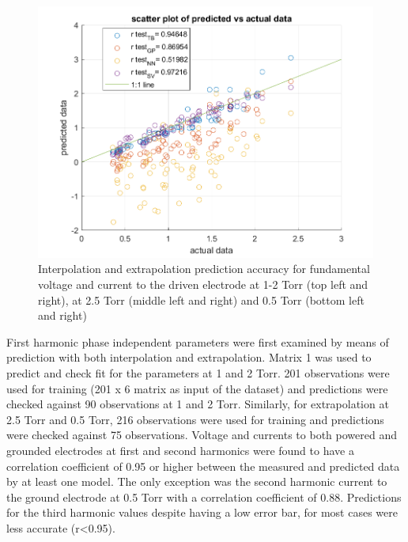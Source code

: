 \documentclass[12pt]{iopart}
\begin{document}
\begin{figure}[ht!]
\begin{center}
\begin{minipage}{0.495\textwidth}
\end{minipage}
\begin{minipage}{0.495\textwidth}
    \includegraphics[width=1\textwidth]{current1500mT.png}
\end{minipage}

\caption{Interpolation and extrapolation prediction accuracy for fundamental voltage and current to the driven electrode at 1-2 Torr (top left and right), at 2.5 Torr (middle left and right) and 0.5 Torr (bottom left and right) } 

\label{Fig:gap_SV,pressure_TB,species_TB}
\end{center}
\end{figure}

First harmonic phase independent parameters were first examined by means of prediction with both interpolation and extrapolation. Matrix 1 was used to predict and check fit for the parameters at 1 and 2 Torr. 201 observations were used for training (201 x 6 matrix as input of the dataset) and predictions were checked against 90 observations at 1 and 2 Torr. Similarly, for extrapolation at 2.5 Torr and 0.5 Torr, 216 observations were used for training and predictions were checked against 75 observations. Voltage and currents to both powered and grounded electrodes at first and second harmonics were found to have a correlation coefficient of 0.95 or higher between the measured and predicted data by at least one model. The only exception was the second harmonic current to the ground electrode at 0.5 Torr with a correlation coefficient of 0.88. Predictions for the third harmonic values despite having a low error bar, for most cases were less accurate (r<0.95).
\end{document}
